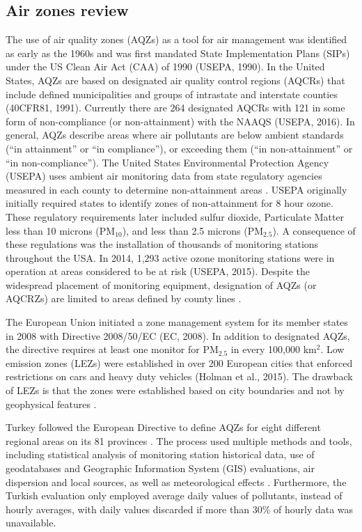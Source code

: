 \subsection{Air zones review}
The use of air quality zones (AQZs) as a tool for air management was identified as early as the 1960s \citep{Breivogel1961, Holland1960} and was first mandated State Implementation Plans (SIPs) under the US Clean Air Act (CAA) of 1990 (USEPA, 1990). In the United States, AQZs are based on designated air quality control regions (AQCRs) that include defined municipalities and groups of intrastate and interstate counties (40CFR81, 1991). Currently there are 264 designated AQCRs with 121 in some form of non-compliance (or non-attainment) with the NAAQS (USEPA, 2016). In general, AQZs describe areas where air pollutants are below ambient standards (“in attainment” or “in compliance”), or exceeding them (“in non-attainment” or “in non-compliance”).  The United States Environmental Protection Agency (USEPA) uses ambient air monitoring data from state regulatory agencies measured in each county to determine non-attainment areas \citep{Carr2012}.  USEPA originally initially required states to identify zones of non-attainment for 8 hour ozone.  These regulatory requirements later included sulfur dioxide, Particulate Matter less than 10 microns (PM$_{10}$), and less than 2.5 microns (PM$_{2.5}$).  A consequence of these regulations was the installation of thousands of monitoring stations throughout the USA.  In 2014, 1,293 active ozone monitoring stations were in operation at areas considered to be at risk (USEPA, 2015).  Despite the widespread placement of monitoring equipment, designation of AQZs (or AQCRZs) are limited to areas defined by county lines \citep{Carr2012}.

The European Union initiated a zone management system for its member states in 2008 with Directive 2008/50/EC (EC, 2008).  In addition to designated AQZs, the directive requires at least one monitor for PM$_{2.5}$ in every 100,000 km$^{2}$.  Low emission zones (LEZs) were established in over 200 European cities that enforced restrictions on cars and heavy duty vehicles (Holman et al., 2015).  The drawback of LEZs is that the zones were established based on city boundaries and not by geophysical features \citep{Henschel2013}.

Turkey followed the European Directive to define AQZs for  eight different regional areas on its 81 provinces \citep{CYGM2010}.  The process used multiple methods and tools, including statistical analysis of monitoring station historical data, use of geodatabases and Geographic Information System (GIS) evaluations, air dispersion and local sources, as well as meteorological effects \citep{Karaca2012}.  Furthermore, the Turkish evaluation only employed average daily values of pollutants, instead of hourly averages, with daily values discarded if more than 30\% of hourly data was unavailable.  

